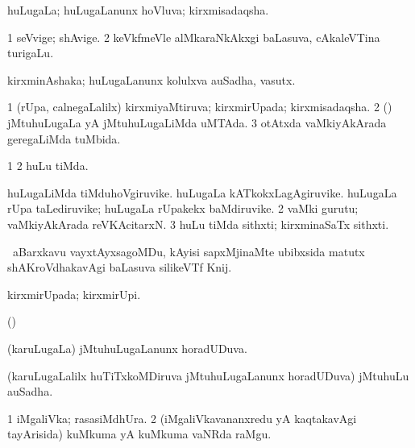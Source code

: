 {{{\bentry
{} 
\gl{\gu}
\expl{}
\bmng
huLugaLa; huLugaLanunx hoVluva; kirxmisadaqsha. 
\emng
\eentry

\bentry
{} 
\gl{\nA}
\expl{}
\bmng
\bnum
\num{1} seVvige; shAvige. 
\num{2} keVkfmeVle alMkaraNkAkxgi baLasuva, cAkaleVTina turigaLu. 
\enum
\emng
\eentry

\bentry
{} 
\gl{\nA}
\expl{}
\bmng
kirxminAshaka; huLugaLanunx kolulxva auSadha, vasutx. 
\emng
\eentry

\bentry
{} 
\gl{\gu}
\expl{}
\bmng
\bnum
\num{1} (rUpa, calnegaLalilx) kirxmiyaMtiruva; kirxmirUpada; kirxmisadaqsha. 
\num{2} (\veYshA) jMtuhuLugaLa yA jMtuhuLugaLiMda uMTAda. 
\num{3} otAtxda vaMkiyAkArada geregaLiMda tuMbida. 
\enum
\emng
\eentry

\bentry
{} 
\gl{\gu}
\expl{}
\bmng
\bnum
\num{1}  
\num{2} huLu tiMda. 
\enum
\emng
\eentry

\bentry
{} 
\gl{\nA}
\expl{}
\bmng
\bnum
{} 
\banum
{} huLugaLiMda tiMduhoVgiruvike. 
 huLugaLa kATkokxLagAgiruvike. 
 huLugaLa rUpa taLediruvike; huLugaLa rUpakekx baMdiruvike. 
\eanum
\numie
\num{2} vaMki gurutu; vaMkiyAkArada reVKAcitarxN. 
\num{3} huLu tiMda sithxti; kirxminaSaTx sithxti. 
\enum
\emng
\eentry

\bentry
{} 
\gl{\nA}
\expl{}
\bmng
 \sA\ aBarxkavu vayxtAyxsagoMDu, kAyisi sapxMjinaMte ubibxsida matutx shAKroVdhakavAgi baLasuva silikeVTf Knij. 
\emng
\eentry

\bentry
{} 
\gl{\gu}
\expl{}
\bmng
 kirxmirUpada; kirxmirUpi. 
\emng
\eentry

\bentry
{}
\gl{\nA}
\expl{}
\bmng
 (\aMrashA) 
\emng
\eentry

\bentry
{} 
\gl{\gu}
\expl{}
\bmng
 (karuLugaLa) jMtuhuLugaLanunx horadUDuva. 
\emng
\eentry

\bentry
{} 
\gl{\nA}
\expl{}
\bmng
 (karuLugaLalilx huTiTxkoMDiruva jMtuhuLugaLanunx horadUDuva) jMtuhuLu auSadha. 
\emng
\eentry

\bentry
{} 
\gl{\nA}
\expl{}
\bmng
\bnum
\num{1} iMgaliVka; rasasiMdhUra. 
\num{2} (iMgaliVkavananxredu yA kaqtakavAgi tayArisida) kuMkuma yA kuMkuma vaNRda raMgu. 
\enum
\emng
\eentry

}}}
